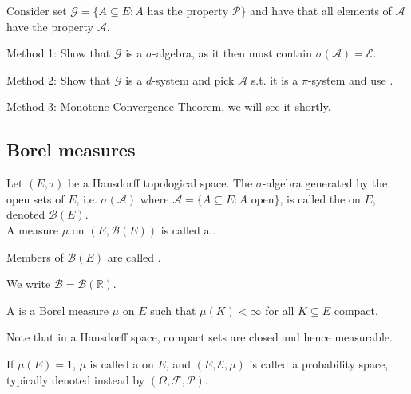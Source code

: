 \begin{answer} \label{ans:1}
	Consider set $\mathcal{G} = \{A \subseteq E : A \text{ has the property } \mathcal{P}\}$ and have that all elements of $\mathcal{A}$ have the property $\mathcal{A}$.

	Method 1: Show that $\mathcal{G}$ is a $\sigma$-algebra, as it then must contain $\sigma(\mathcal{A}) = \mathcal{E}$.

	Method 2: Show that $\mathcal{G}$ is a $d$-system and pick $\mathcal{A}$ s.t. it is a $\pi$-system and use .

	Method 3: Monotone Convergence Theorem, we will see it shortly.
\end{answer}

\subsection{Borel measures}

\begin{definition}
	Let $(E, \tau)$ be a Hausdorff topological space.
	The $\sigma$-algebra generated by the open sets of $E$, i.e. $\sigma(\mathcal{A})$ where $\mathcal{A} = \{A \subseteq E : A \text{ open}\}$, is called the  on $E$, denoted $\mathcal B(E)$. \\
	A measure $\mu$ on $(E, \mathcal B(E))$ is called a .

	Members of $\mathcal B(E)$ are called .
\end{definition}

\begin{notation}
	We write $\mathcal B = \mathcal B(\mathbb R)$.
\end{notation}

\begin{definition}
	A  is a Borel measure $\mu$ on $E$ such that $\mu(K) < \infty$ for all $K \subseteq E$ compact.
\end{definition}
Note that in a Hausdorff space, compact sets are closed and hence measurable.

\begin{definition}
	If $\mu(E) = 1$, $\mu$ is called a  on $E$, and $(E, \mathcal{E}, \mu)$ is called a probability space, typically denoted instead by $(\Omega, \mathcal{F}, \mathcal{P})$.
\end{definition}

